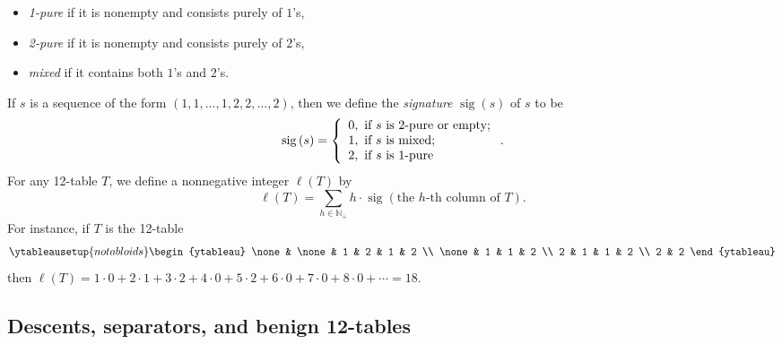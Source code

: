 \documentclass[numbers=enddot,12pt,final,onecolumn,notitlepage]{scrartcl}%
\theoremstyle{definition}
\let\sumnonlimits\sum
\renewcommand{\sum}{\sumnonlimits\limits}
\begin{document}
\begin{itemize}
\item \textit{1-pure} if it is nonempty and consists purely of $1$'s,

\item \textit{2-pure} if it is nonempty and consists purely of $2$'s,

\item \textit{mixed} if it contains both $1$'s and $2$'s.
\end{itemize}

If $s$ is a sequence of the form $(1,1,\ldots,1,2,2,\ldots,2)$, then we define the
\textit{signature} $\operatorname*{sig}\left(  s\right)
$ of $s$ to be
\[
\operatorname*{sig}\left(  s\right) = \left\{
\begin{array}
[c]{l}%
0,\text{ if }s\text{ is 2-pure or empty;}\\
1,\text{ if }s\text{ is mixed;}\\
2,\text{ if }s\text{ is 1-pure}%
\end{array}
\right.
.
\]
For any 12-table $T$, we define a nonnegative integer $\ell\left(
T\right)  $ by%
\[
\ell\left(  T\right)  =\sum_{h\in\mathbb{N}_{+}}h\cdot\operatorname*{sig}%
\left(  \text{the }h\text{-th column of }T\right)  .
\]
For instance, if $T$ is the 12-table
\begin{equation}
%
\ytableausetup{notabloids}
\begin{ytableau}
\none& \none& 1 & 2 & 1 & 2 \\
\none& 1 & 1 & 2 \\
2 & 1 & 1 & 2 \\
2 & 2
\end{ytableau}%
\label{eq.example-12-table.1}
\end{equation}
then $\ell\left(  T\right)  =1\cdot0+2\cdot1+3\cdot2+4\cdot0+5\cdot
2+6\cdot0+7\cdot0+8\cdot0+\cdots=18$.

\subsection{\label{subsection:benign}Descents, separators, and benign 12-tables}
\end{document}
